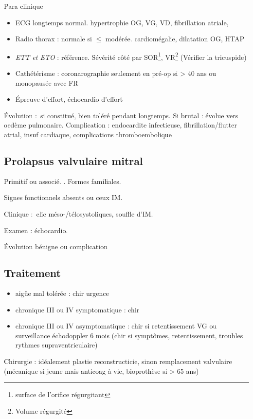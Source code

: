 Para clinique
\begin{itemize}
  \item ECG longtemps normal. hypertrophie OG, VG, VD, fibrillation atriale, 
  \item Radio thorax : normale si $\le$ modérée. cardiomégalie, dilatation OG,
    HTAP
  \item \textit{ETT et ETO} : référence. Sévérité côté par SOR\footnote{surface
    de l'orifice régurgitant}, VR\footnote{Volume régurgité} (Vérifier la
    tricuspide)
  \item Cathétérisme : coronarographie seulement en pré-op si \male > 40 ans ou
    \female monopausée avec FR
  \item Épreuve d'effort, échocardio d'effort
\end{itemize}

Évolution : si constitué, bien toléré pendant longtemps. Si brutal : évolue vers
oedème pulmonaire. Complication : endocardite infectieuse, fibrillation/flutter
atrial, insuf cardiaque, complications thromboembolique

\subsection{Prolapsus valvulaire mitral}
Primitif ou associé. \female. Formes familiales.

Signes fonctionnels absents ou ceux IM.

Clinique : clic méso-/télosystoliques, souffle d'IM.

Examen : échocardio.

Évolution bénigne ou complication

\subsection{Traitement}
\begin{itemize}
  \item aigüe mal tolérée : chir urgence 
  \item chronique III ou IV symptomatique : chir
  \item chronique III ou IV asymptomatique : chir si retentissement VG ou
    surveillance échodoppler 6 mois (chir si symptômes, retentissement, troubles
    rythmes supraventriculaire)
\end{itemize}

Chirurgie : idéalement plastie reconstructicie, sinon remplacement valvulaire
(mécanique si jeune mais anticoag à vie, bioprothèse si > 65 ans)

